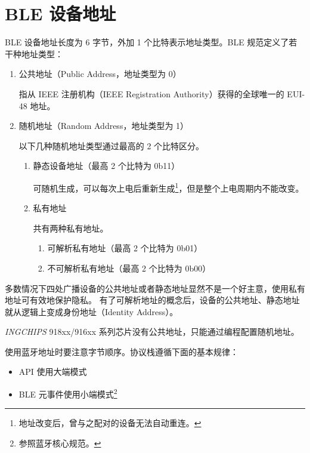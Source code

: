 \documentclass[
  12pt,
]{book}
\makeatletter
\providecommand{\tightlist}{%
  \setlength{\itemsep}{0pt}\setlength{\parskip}{0pt}}
\newenvironment{kframe}{%
\medskip{}
\setlength{\fboxsep}{.8em}
 \def\at@end@of@kframe{}%
 \ifinner\ifhmode%
  \def\at@end@of@kframe{\end{minipage}}%
  \begin{minipage}{\columnwidth}%
 \fi\fi%
 \def\FrameCommand##1{\hskip\@totalleftmargin \hskip-\fboxsep
 \colorbox{shadecolor}{##1}\hskip-\fboxsep
     \hskip-\linewidth \hskip-\@totalleftmargin \hskip\columnwidth}%
 \MakeFramed {\advance\hsize-\width
   \@totalleftmargin\z@ \linewidth\hsize
   \@setminipage}}%
 {\par\unskip\endMakeFramed%
 \at@end@of@kframe}
\newenvironment{rmdblock}[1]
  {
  \begin{itemize}
  \renewcommand{\labelitemi}{
    \raisebox{-.7\height}[0pt][0pt]{
      {\setkeys{Gin}{width=3em,keepaspectratio}\texttt{[image: images/\#1]}}
    }
  }
  \setlength{\fboxsep}{1em}
  \begin{kframe}
  \item
  }
  {
  \end{kframe}
  \end{itemize}
  }
\newenvironment{rmdcaution}
  {\begin{rmdblock}{caution}}
  {\end{rmdblock}}
\makeatother
\begin{document}
\hypertarget{ble-ux8bbeux5907ux5730ux5740}{%
\section{BLE 设备地址}\label{ble-ux8bbeux5907ux5730ux5740}}

BLE 设备地址长度为 6 字节，外加 1 个比特表示地址类型。BLE 规范定义了若干种地址类型：

\begin{enumerate}
\def\labelenumi{\arabic{enumi}.}
\item
  公共地址（Public Address，地址类型为 0）

  指从 IEEE 注册机构（IEEE Registration Authority）获得的全球唯一的 EUI-48 地址。
\item
  随机地址（Random Address，地址类型为 1）

  以下几种随机地址类型通过最高的 2 个比特区分。

  \begin{enumerate}
  \def\labelenumii{\arabic{enumii}.}
  \item
    静态设备地址（最高 2 个比特为 0b11）

    可随机生成，可以每次上电后重新生成\footnote{地址改变后，曾与之配对的设备无法自动重连。}，但是整个上电周期内不能改变。
  \item
    私有地址

    共有两种私有地址。

    \begin{enumerate}
    \def\labelenumiii{\arabic{enumiii}.}
    \item
      可解析私有地址（最高 2 个比特为 0b01）
    \item
      不可解析私有地址（最高 2 个比特为 0b00）
    \end{enumerate}
  \end{enumerate}
\end{enumerate}

多数情况下四处广播设备的公共地址或者静态地址显然不是一个好主意，使用私有地址可有效地保护隐私。
有了可解析地址的概念后，设备的公共地址、静态地址就从逻辑上变成身份地址（Identity Address）。

\begin{rmdcaution}
\emph{INGCHIPS} 918xx/916xx
系列芯片没有公共地址，只能通过编程配置随机地址。
\end{rmdcaution}

使用蓝牙地址时要注意字节顺序。协议栈遵循下面的基本规律：

\begin{itemize}
\tightlist
\item
  API 使用大端模式
\item
  BLE 元事件使用小端模式\footnote{参照蓝牙核心规范。}
\end{itemize}
\end{document}
